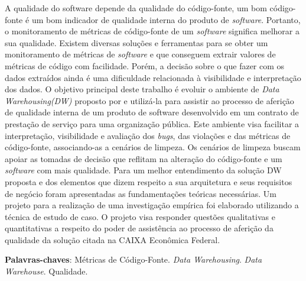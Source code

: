 \begin{resumo}




A qualidade do software depende da qualidade do código-fonte, um bom código-fonte é um bom indicador de qualidade interna do produto de \textit{software}. Portanto, o monitoramento de métricas de código-fonte de um \textit{software} significa melhorar a sua qualidade. Existem diversas soluções e ferramentas para se obter um monitoramento de métricas de \textit{software} e que conseguem extrair valores de métricas de código com facilidade. Porém, a decisão sobre o que fazer com os dados extraídos ainda é uma dificuldade relacionada à visibilidade e interpretação dos dados. O objetivo principal deste trabalho é evoluir o ambiente de \textit{Data Warehousing(DW)} proposto por  e utilizá-la para assistir ao processo de aferição de qualidade interna de um produto de software desenvolvido em um contrato de prestação de serviço para uma organização pública. Este ambiente visa facilitar a interpretação, visibilidade e avaliação dos \textit{bugs}, das violações e das métricas de código-fonte, associando-as a cenários de limpeza. Os cenários de limpeza buscam apoiar as tomadas de decisão que reflitam na alteração do código-fonte e um \textit{software} com mais qualidade. Para um melhor entendimento da solução DW proposta e dos elementos que dizem respeito a sua arquitetura e seus requisitos de negócio foram apresentadas as fundamentações teóricas necessárias. Um projeto para a realização de uma investigação empírica foi elaborado utilizando a técnica de estudo de caso. O projeto visa responder questões qualitativas e quantitativas a respeito do poder de assistência ao processo de aferição da qualidade da solução citada na CAIXA Econômica Federal.
 
 

 \vspace{\onelineskip}
    
 \noindent
 \textbf{Palavras-chaves}: Métricas de Código-Fonte. \textit{Data Warehousing}. \textit{Data Warehouse}. Qualidade.
\end{resumo}
